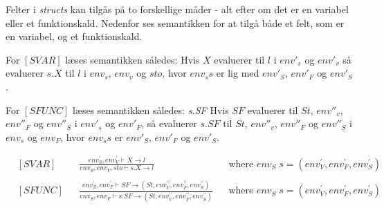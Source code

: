 Felter i \textit{structs} kan tilgås på to forskellige måder - alt efter om det er en variabel eller et funktionskald. Nedenfor ses semantikken for at tilgå både et felt, som er en variabel, og et funktionskald.

For $[SVAR]$ læses semantikken således:
Hvis $X$ evaluerer til $l$ i $env'_s$ og $env'_v$ så evaluerer $s.X$ til $l$ i $env_s$, $env_v$ og $sto$, hvor $env_s s$ er lig med $env'_S$, $env'_F$ og $env'_S$. 


For $[SFUNC]$ læses semantikken således: \textit{s.SF}
Hvis $SF$ evaluerer til $St$, $env''_v$, $env''_F$ og $env''_S$ i $env'_s$ og $env'_F$, så evaluerer $s.SF$ til $St$, $env''_v$, $env''_F$ og $env''_S$ i $env_s$ og $env_F$, hvor $env_s s$ er $env'_S$, $env'_F$ og $env'_S$. 


\begin{align*}
&[SVAR] & &\frac{env_S^\prime, env_V^\prime \vdash X \rightarrow l}{env_S, env_V, sto \vdash s.X \rightarrow l} & &\text{where } env_S\; s = (env_V^\prime, env_F^\prime, env_S^\prime)\\\\
&[SFUNC] & &\frac{env_S^\prime, env_F^\prime \vdash SF \rightarrow (St, env_V^{\prime\prime}, env_F^{\prime\prime}, env_S^{\prime\prime})}{env_S, env_F \vdash s.SF \rightarrow (St, env_V^{\prime\prime}, env_F^{\prime\prime}, env_S^{\prime\prime})} & &\text{where } env_S\; s = (env_V^\prime, env_F^\prime, env_S^\prime)
\end{align*}